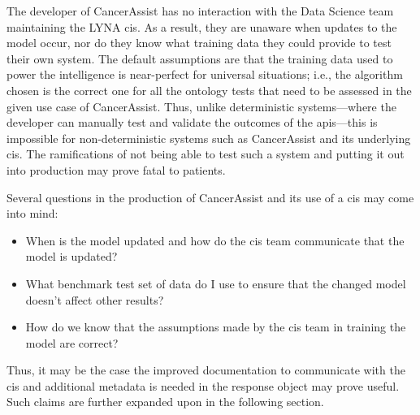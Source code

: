 The developer of CancerAssist has no interaction with the Data Science team maintaining the LYNA \gls{cis}. As a result, they are unaware when updates to the model occur, nor do they know what training data they could provide to test their own system. The default assumptions are that the training data used to power the intelligence is near-perfect for universal situations; i.e., the algorithm chosen is the correct one for all the ontology tests that need to be assessed in the given use case of CancerAssist. Thus, unlike deterministic systems---where the developer can manually test and validate the outcomes of the \glspl{api}---this is impossible for non-deterministic systems such as CancerAssist and its underlying \gls{cis}. The ramifications of not being able to test such a system and putting it out into production may prove fatal to patients.

Several questions in the production of CancerAssist and its use of a \gls{cis} may come into mind:

\begin{itemize}
  \item When is the model updated and how do the \gls{cis} team communicate that the model is updated?
  \item What benchmark test set of data do I use to ensure that the changed model doesn't affect other results?
  \item How do we know that the assumptions made by the \gls{cis} team in training the model are correct?
\end{itemize}

Thus, it may be the case the improved documentation to communicate with the \gls{cis} and additional metadata is needed in the response object may prove useful. Such claims are further expanded upon in the following section.

